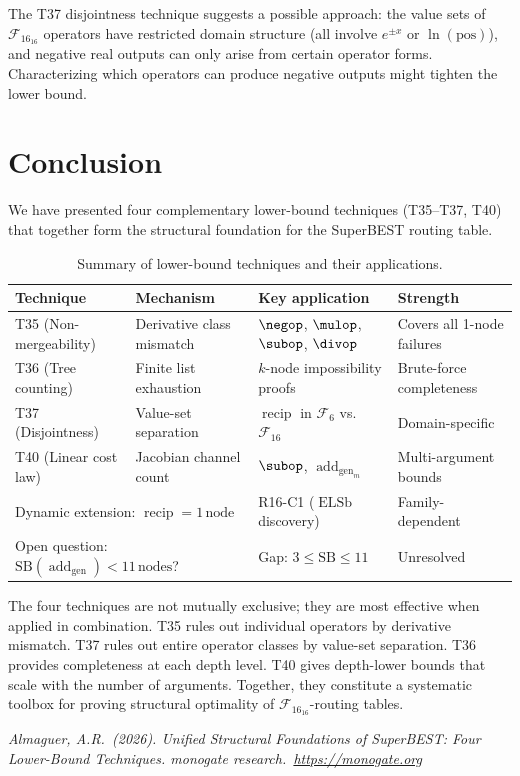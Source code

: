 \documentclass[12pt,a4paper]{article}
\theoremstyle{definition}
\newcommand{\ELSb}{\operatorname{ELSb}}
\newcommand{\F}{\mathcal{F}_{16}}
\newcommand{\SB}{\mathrm{SB}}
\newcommand{\recip}{\operatorname{recip}}
\newcommand{\addgen}{\operatorname{add}_{\mathrm{gen}}}
\begin{document}
The T37 disjointness technique suggests a possible approach: the value sets
of $\F_{16}$ operators have restricted domain structure (all involve
$e^{\pm x}$ or $\ln(\text{pos})$), and negative real outputs can only arise
from certain operator forms.  Characterizing which operators can produce
negative outputs might tighten the lower bound.

\section{Conclusion}
\label{sec:conclusion}

We have presented four complementary lower-bound techniques (T35--T37, T40)
that together form the structural foundation for the SuperBEST routing table.

\begin{table}[h]
\centering
\caption{Summary of lower-bound techniques and their applications.}
\label{tab:techniques}
\smallskip
\begin{tabular}{@{}llll@{}}
\toprule
\textbf{Technique} & \textbf{Mechanism} & \textbf{Key application} & \textbf{Strength} \\
\midrule
T35 (Non-mergeability) & Derivative class mismatch & $\negop$, $\mulop$, $\subop$, $\divop$ & Covers all 1-node failures \\
T36 (Tree counting) & Finite list exhaustion & $k$-node impossibility proofs & Brute-force completeness \\
T37 (Disjointness) & Value-set separation & $\recip$ in $\mathcal{F}_6$ vs.\ $\mathcal{F}_{16}$ & Domain-specific \\
T40 (Linear cost law) & Jacobian channel count & $\subop$, $\addgen_m$ & Multi-argument bounds \\
\midrule
\multicolumn{2}{l}{Dynamic extension: $\recip = 1\,\text{node}$}
  & R16-C1 ($\ELSb$ discovery)
  & Family-dependent \\
\midrule
\multicolumn{2}{l}{Open question: $\SB(\addgen) < 11\,\text{nodes}$?}
  & Gap: $3 \le \SB \le 11$
  & Unresolved \\
\bottomrule
\end{tabular}
\end{table}

The four techniques are not mutually exclusive; they are most effective when
applied in combination.  T35 rules out individual operators by derivative
mismatch.  T37 rules out entire operator classes by value-set separation.
T36 provides completeness at each depth level.  T40 gives depth-lower bounds
that scale with the number of arguments.  Together, they constitute a
systematic toolbox for proving structural optimality of $\F_{16}$-routing tables.

\bigskip
\noindent\textit{Almaguer, A.R.\ (2026).
Unified Structural Foundations of SuperBEST: Four Lower-Bound Techniques.
monogate research.\ \url{https://monogate.org}}
\end{document}
